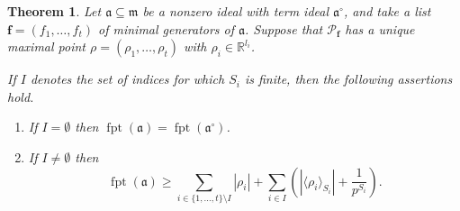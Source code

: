 \documentclass[12pt]{amsart}
\newtheorem{theorem}{Theorem}[section]
\theoremstyle{definition}
\numberwithin{equation}{subsection}
\DeclareMathOperator{\fpt}{fpt}
\newcommand{\RR}{\mathbb{R}}
\newcommand{\m}{\mathfrak{m}}
\newcommand{\fa}{\mathfrak{a}}
\newcommand{\SP}{\mathcal{P}}
\newcommand{\Bf}{\boldsymbol{f}}
\renewcommand{\!}[1]{{\color{red}\text{\Huge$\star$ }#1}}
\begin{document}
\begin{theorem} \label{Thm:F-pure-threshold-polytope}
	Let $\fa \subseteq \m$ be a nonzero ideal with term ideal $\fa^\circ$, and take a list $\Bf=(f_1,\ldots,f_t)$  of minimal generators of $\fa$. Suppose that $\SP_{\Bf}$ has a unique maximal point $\rho=(\rho_1, \ldots, \rho_t)$ with $\rho_i \in \RR^{l_i}$.
	
	\noindent If $I$ denotes the set of indices for which $S_i$ is finite, then the following assertions hold.
	\begin{enumerate}
		\item If $I= \emptyset$ then $\fpt(\fa)=\fpt(\fa^\circ)$. 
		\item If $I \ne \emptyset$ then 
		\[
			\fpt(\fa) \geq \sum_{i \in \{1,\ldots,t\} \setminus I}|\rho_i| + \sum_{i \in I}\left(|\langle \rho_i \rangle_{S_i}|+\frac{1}{p^{S_i}}\right).
		\]
	\end{enumerate}
\end{theorem}
\end{document}
